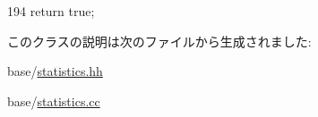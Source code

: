 \begin{DoxyCode}
194 { return true; }
\end{DoxyCode}


このクラスの説明は次のファイルから生成されました:\begin{DoxyCompactItemize}
\item 
base/\hyperlink{statistics_8hh}{statistics.hh}\item 
base/\hyperlink{statistics_8cc}{statistics.cc}\end{DoxyCompactItemize}
